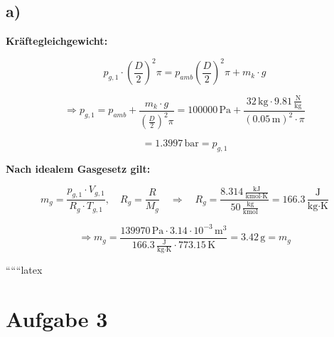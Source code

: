 

\subsection*{a)}

\textbf{Kräftegleichgewicht:}

\[
p_{g,1} \cdot \left(\frac{D}{2}\right)^2 \pi = p_{amb} \left(\frac{D}{2}\right)^2 \pi + m_k \cdot g
\]

\[
\Rightarrow p_{g,1} = p_{amb} + \frac{m_k \cdot g}{\left(\frac{D}{2}\right)^2 \pi} = 100000 \, \text{Pa} + \frac{32 \, \text{kg} \cdot 9.81 \, \frac{\text{N}}{\text{kg}}}{(0.05 \, \text{m})^2 \cdot \pi}
\]

\[
= \boxed{1.3997 \, \text{bar} = p_{g,1}}
\]

\textbf{Nach idealem Gasgesetz gilt:}

\[
m_g = \frac{p_{g,1} \cdot V_{g,1}}{R_g \cdot T_{g,1}}, \quad R_g = \frac{R}{M_g} \quad \Rightarrow \quad R_g = \frac{8.314 \, \frac{\text{kJ}}{\text{kmol} \cdot \text{K}}}{50 \, \frac{\text{kg}}{\text{kmol}}} = 166.3 \, \frac{\text{J}}{\text{kg} \cdot \text{K}}
\]

\[
\Rightarrow m_g = \frac{139970 \, \text{Pa} \cdot 3.14 \cdot 10^{-3} \, \text{m}^3}{166.3 \, \frac{\text{J}}{\text{kg} \cdot \text{K}} \cdot 773.15 \, \text{K}} = \boxed{3.42 \, \text{g} = m_g}
\]

``````latex


\section*{Aufgabe 3}